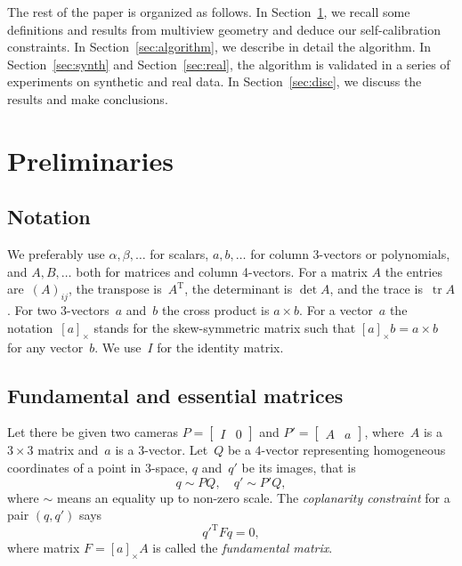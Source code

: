 \documentclass[reqno]{amsart}
\DeclareMathOperator{\tr}{tr}
\theoremstyle{plain}
\begin{document}
The rest of the paper is organized as follows. In Section~\ref{sec:prel}, we recall some definitions and results from multiview geometry and deduce our self-calibration constraints. In Section~\ref{sec:algorithm}, we describe in detail the algorithm. In Section~\ref{sec:synth} and Section~\ref{sec:real}, the algorithm is validated in a series of experiments on synthetic and real data. In Section~\ref{sec:disc}, we discuss the results and make conclusions.



\section{Preliminaries}
\label{sec:prel}

\subsection{Notation}

We preferably use $\alpha, \beta, \ldots$ for scalars, $a, b, \ldots$ for column 3-vectors or polynomials, and $A, B, \ldots$ both for matrices and column 4-vectors. For a matrix $A$ the entries are~$(A)_{ij}$, the transpose is~$A^{\mathrm T}$, the determinant is $\det A$, and the trace is~$\tr A$. For two 3-vectors~$a$ and~$b$ the cross product is $a\times b$. For a vector~$a$ the notation~$[a]_\times$ stands for the skew-symmetric matrix such that $[a]_\times b = a \times b$ for any vector~$b$. We use~$I$ for the identity matrix.


\subsection{Fundamental and essential matrices}

Let there be given two cameras $P = \begin{bmatrix} I & 0 \end{bmatrix}$ and $P' = \begin{bmatrix} A & a \end{bmatrix}$, where~$A$ is a $3\times 3$ matrix and~$a$ is a 3-vector. Let~$Q$ be a $4$-vector representing homogeneous coordinates of a point in 3-space, $q$ and~$q'$ be its images, that is
\begin{equation}
q \sim P Q, \quad q' \sim P' Q,
\end{equation}
where $\sim$ means an equality up to non-zero scale. The \emph{coplanarity constraint} for a pair $(q, q')$ says
\begin{equation}
\label{eq:inci2}
q'^{\mathrm T} F q = 0,
\end{equation}
where matrix $F = [a]_\times A$ is called the \emph{fundamental matrix}.
\end{document}
